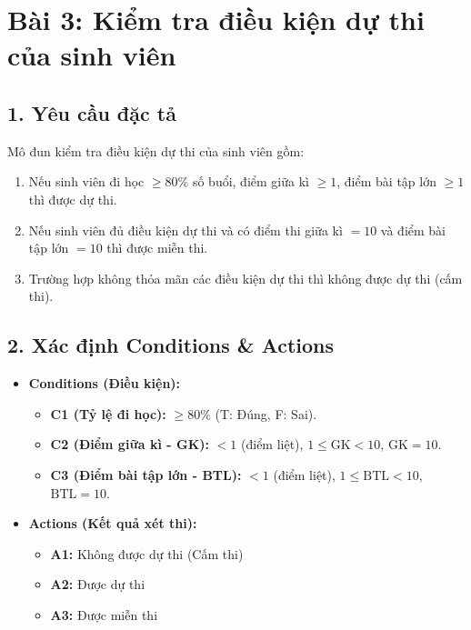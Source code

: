 \documentclass[11pt,a4paper]{article}
\begin{document}
\newpage

\section*{Bài 3: Kiểm tra điều kiện dự thi của sinh viên}

\subsection*{1. Yêu cầu đặc tả}
Mô đun kiểm tra điều kiện dự thi của sinh viên gồm:
\begin{enumerate}[noitemsep]
    \item Nếu sinh viên đi học $\ge 80\%$ số buổi, điểm giữa kì $\ge 1$, điểm bài tập lớn $\ge 1$ thì được dự thi.
    \item Nếu sinh viên đủ điều kiện dự thi và có điểm thi giữa kì $= 10$ và điểm bài tập lớn $= 10$ thì được miễn thi.
    \item Trường hợp không thỏa mãn các điều kiện dự thi thì không được dự thi (cấm thi).
\end{enumerate}

\subsection*{2. Xác định Conditions \& Actions}
\begin{itemize}[noitemsep]
    \item \textbf{Conditions (Điều kiện):}
    \begin{itemize}[noitemsep]
        \item \textbf{C1 (Tỷ lệ đi học):} $\ge 80\%$ (T: Đúng, F: Sai).
        \item \textbf{C2 (Điểm giữa kì - GK):} $< 1$ (điểm liệt), $1 \le \text{GK} < 10$, $\text{GK} = 10$.
        \item \textbf{C3 (Điểm bài tập lớn - BTL):} $< 1$ (điểm liệt), $1 \le \text{BTL} < 10$, $\text{BTL} = 10$.
    \end{itemize}
    \item \textbf{Actions (Kết quả xét thi):}
    \begin{itemize}[noitemsep]
        \item \textbf{A1:} Không được dự thi (Cấm thi)
        \item \textbf{A2:} Được dự thi
        \item \textbf{A3:} Được miễn thi
    \end{itemize}
\end{itemize}
\end{document}

